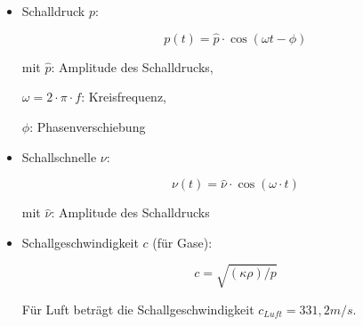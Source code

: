 \bigskip

\begin{center}    
    
\end{center}


\bigskip

\begin{itemize}
  \item Schalldruck $p$:
  
        \begin{equation}
          p(t)=\hat{p} \cdot \cos(\omega t - \phi) 
          \end{equation}
\label{eq: Schalldruck}

mit $\hat{p}$: Amplitude des  Schalldrucks,

$\omega = 2 \cdot \pi \cdot  f$: Kreisfrequenz, 

$\phi$: Phasenverschiebung

  \item Schallschnelle $\nu$:

     \begin{equation}
       \nu(t)=\hat{\nu}\cdot \cos(\omega \cdot  t)
     \end{equation}
\label{eq: Schallschnelle}

mit $\hat{\nu}$: Amplitude des  Schalldrucks

  \item Schallgeschwindigkeit $c$ (für Gase):
  
  \begin{equation}
      c=\sqrt{(\kappa \rho)/p}
  \end{equation}
  \label{eq: Schallgeschwindigkeit}

   \medskip

    Für Luft beträgt die Schallgeschwindigkeit $c_{Luft}=331,2 m/s$.
\end{itemize}


